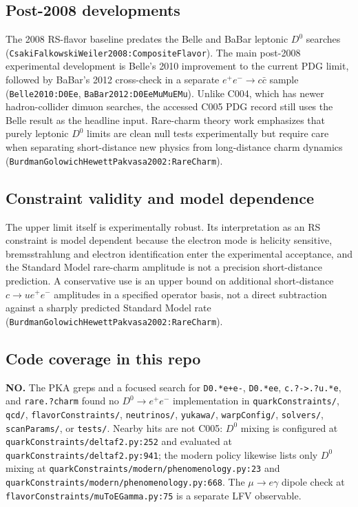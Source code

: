 \subsection*{Post-2008 developments}
The 2008 RS-flavor baseline predates the Belle and BaBar leptonic \(D^0\)
searches (\texttt{CsakiFalkowskiWeiler2008:CompositeFlavor}).  The main
post-2008 experimental development is Belle's 2010 improvement to the current
PDG limit, followed by BaBar's 2012 cross-check in a separate
\(e^+e^-\to c\bar c\) sample
(\texttt{Belle2010:D0Ee}, \texttt{BaBar2012:D0EeMuMuEMu}).  Unlike C004,
which has newer hadron-collider dimuon searches, the accessed C005 PDG record
still uses the Belle result as the headline input.  Rare-charm theory work
emphasizes that purely leptonic \(D^0\) limits are clean null tests
experimentally but require care when separating short-distance new physics from
long-distance charm dynamics
(\texttt{BurdmanGolowichHewettPakvasa2002:RareCharm}).

\subsection*{Constraint validity and model dependence}
The upper limit itself is experimentally robust.  Its interpretation as an RS
constraint is model dependent because the electron mode is helicity sensitive,
bremsstrahlung and electron identification enter the experimental acceptance,
and the Standard Model rare-charm amplitude is not a precision short-distance
prediction.  A conservative use is an upper bound on additional short-distance
\(c\to u e^+e^-\) amplitudes in a specified operator basis, not a direct
subtraction against a sharply predicted Standard Model rate
(\texttt{BurdmanGolowichHewettPakvasa2002:RareCharm}).

\subsection*{Code coverage in this repo}
\textbf{NO.}  The PKA greps and a focused search for
\texttt{D0.*e+e-}, \texttt{D0.*ee}, \texttt{c.?->.?u.*e}, and
\texttt{rare.?charm} found no \(D^0\to e^+e^-\) implementation in
\texttt{quarkConstraints/}, \texttt{qcd/}, \texttt{flavorConstraints/},
\texttt{neutrinos/}, \texttt{yukawa/}, \texttt{warpConfig/},
\texttt{solvers/}, \texttt{scanParams/}, or \texttt{tests/}.  Nearby hits are
not C005: \(D^0\) mixing is configured at
\texttt{quarkConstraints/deltaf2.py:252} and evaluated at
\texttt{quarkConstraints/deltaf2.py:941}; the modern policy likewise lists
only \(D^0\) mixing at \texttt{quarkConstraints/modern/phenomenology.py:23}
and \texttt{quarkConstraints/modern/phenomenology.py:668}.  The
\(\mu\to e\gamma\) dipole check at
\texttt{flavorConstraints/muToEGamma.py:75} is a separate LFV observable.

